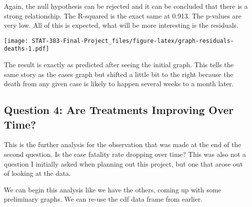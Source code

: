 \documentclass[
]{article}
\newenvironment{Shaded}{\begin{snugshade}}{\end{snugshade}}
\newcommand{\DataTypeTok}[1]{\textcolor[rgb]{0.13,0.29,0.53}{#1}}
\newcommand{\DecValTok}[1]{\textcolor[rgb]{0.00,0.00,0.81}{#1}}
\newcommand{\KeywordTok}[1]{\textcolor[rgb]{0.13,0.29,0.53}{\textbf{#1}}}
\newcommand{\NormalTok}[1]{#1}
\newcommand{\OperatorTok}[1]{\textcolor[rgb]{0.81,0.36,0.00}{\textbf{#1}}}
\newcommand{\StringTok}[1]{\textcolor[rgb]{0.31,0.60,0.02}{#1}}
\begin{document}
Again, the null hypothesis can be rejected and it can be concluded that
there is a strong relationship. The R-squared is the exact same at
0.913. The p-values are very low. All of this is expected, what will be
more interesting is the residuals.

\begin{Shaded}
\end{Shaded}

\texttt{[image: STAT-383-Final-Project\_files/figure-latex/graph-residuals-deaths-1.pdf]}

The result is exactly as predicted after seeing the initial graph. This
tells the same story as the cases graph but shifted a little bit to the
right because the death from any given case is likely to happen several
weeks to a month later.

\hypertarget{question-4-are-treatments-improving-over-time}{%
\subsection{Question 4: Are Treatments Improving Over
Time?}\label{question-4-are-treatments-improving-over-time}}

This is the further analysis for the observation that was made at the
end of the second question. Is the case fatality rate dropping over
time? This was also not a question I initially asked when planning out
this project, but one that arose out of looking at the data.

We can begin this analysis like we have the others, coming up with some
preliminary graphs. We can re-use the cdf data frame from earlier.
\end{document}
